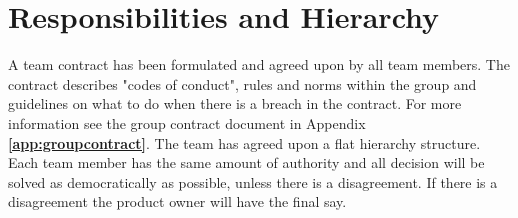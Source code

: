\section{Responsibilities and Hierarchy}

A team contract has been formulated and agreed upon by all team members. The contract describes "codes of conduct", rules and norms within the group and guidelines on what to do when there is a breach in the contract. For more information see the group contract document in Appendix \textbf{\ref{app:groupcontract}}. The team has agreed upon a flat hierarchy structure. Each team member has the same amount of authority and all decision will be solved as democratically as possible, unless there is a disagreement. If there is a disagreement the product owner will have the final say.\bigskip

